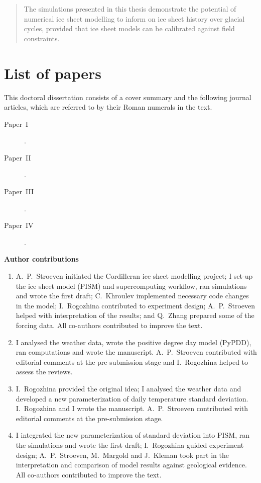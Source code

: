 \documentclass{article}
\newcommand{\CCLI}[0]{Paper~I}      %
\newcommand{\PSDV}[0]{Paper~II}     %
\newcommand{\PSDP}[0]{Paper~III}    %
\newcommand{\CCYC}[0]{Paper~IV}     %
\begin{document}
\begin{abstract}
The simulations presented in this thesis demonstrate the potential of numerical
ice sheet modelling to inform on ice sheet history over glacial cycles,
provided that ice sheet models can be calibrated against field constraints.

\end{abstract}

\newpage

\section*{List of papers}

This doctoral dissertation consists of a cover summary and the following
journal articles, which are referred to by their Roman numerals in the text.

\begin{description}
  \item[\CCLI] .
  \item[\PSDV] .
  \item[\PSDP] .
  \item[\CCYC] .
\end{description}

\vfill
\noindent\textbf{Author contributions}

\footnotesize{\begin{enumerate}
  \item[I] A.~P.~Stroeven initiated the Cordilleran ice sheet modelling
project; I set-up the ice sheet model (PISM) and supercomputing workflow, ran
simulations and wrote the first draft; C.~Khroulev implemented necessary code
changes in the model; I.~Rogozhina contributed to experiment design; A.~P.~Stroeven
helped with interpretation of the results; and Q.~Zhang prepared some of the
forcing data. All co-authors contributed to improve the text.
  \item[II] I analysed the weather data, wrote the positive degree day model
(PyPDD), ran computations and wrote the manuscript. A.~P.~Stroeven contributed
with editorial comments at the pre-submission stage and I.~Rogozhina helped to
assess the reviews.
  \item[III] I.~Rogozhina provided the original idea; I analysed the weather
data and developed a new parameterization of daily temperature standard
deviation. I.~Rogozhina and I wrote the manuscript. A.~P.~Stroeven contributed
with editorial comments at the pre-submission stage.
  \item[IV] I integrated the new parameterization of standard deviation into
PISM, ran the simulations and wrote the first draft; I.~Rogozhina guided
experiment design; A.~P.~Stroeven, M.~Margold and J.~Kleman took part in the
interpretation and comparison of model results against geological evidence. All
co-authors contributed to improve the text.
\end{enumerate}}
\end{document}
